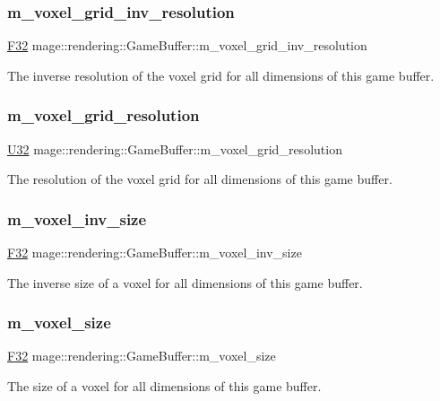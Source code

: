 \subsubsection{\texorpdfstring{m\+\_\+voxel\+\_\+grid\+\_\+inv\+\_\+resolution}{m\_voxel\_grid\_inv\_resolution}}
{\footnotesize\ttfamily \hyperlink{namespacemage_aa97e833b45f06d60a0a9c4fc22ae02c0}{F32} mage\+::rendering\+::\+Game\+Buffer\+::m\+\_\+voxel\+\_\+grid\+\_\+inv\+\_\+resolution}

The inverse resolution of the voxel grid for all dimensions of this game buffer. \hypertarget{structmage_1_1rendering_1_1_game_buffer_a705874f8b8be19a790faf47639e750a5}{}\label{structmage_1_1rendering_1_1_game_buffer_a705874f8b8be19a790faf47639e750a5} 
\subsubsection{\texorpdfstring{m\+\_\+voxel\+\_\+grid\+\_\+resolution}{m\_voxel\_grid\_resolution}}
{\footnotesize\ttfamily \hyperlink{namespacemage_a41c104c036fba3756a74e19f793eeaa1}{U32} mage\+::rendering\+::\+Game\+Buffer\+::m\+\_\+voxel\+\_\+grid\+\_\+resolution}

The resolution of the voxel grid for all dimensions of this game buffer. \hypertarget{structmage_1_1rendering_1_1_game_buffer_add22463d853cd1b33c605257d44bec07}{}\label{structmage_1_1rendering_1_1_game_buffer_add22463d853cd1b33c605257d44bec07} 
\subsubsection{\texorpdfstring{m\+\_\+voxel\+\_\+inv\+\_\+size}{m\_voxel\_inv\_size}}
{\footnotesize\ttfamily \hyperlink{namespacemage_aa97e833b45f06d60a0a9c4fc22ae02c0}{F32} mage\+::rendering\+::\+Game\+Buffer\+::m\+\_\+voxel\+\_\+inv\+\_\+size}

The inverse size of a voxel for all dimensions of this game buffer. \hypertarget{structmage_1_1rendering_1_1_game_buffer_a792ab7eca88d2a2f425d06df602d6e11}{}\label{structmage_1_1rendering_1_1_game_buffer_a792ab7eca88d2a2f425d06df602d6e11} 
\subsubsection{\texorpdfstring{m\+\_\+voxel\+\_\+size}{m\_voxel\_size}}
{\footnotesize\ttfamily \hyperlink{namespacemage_aa97e833b45f06d60a0a9c4fc22ae02c0}{F32} mage\+::rendering\+::\+Game\+Buffer\+::m\+\_\+voxel\+\_\+size}

The size of a voxel for all dimensions of this game buffer. 